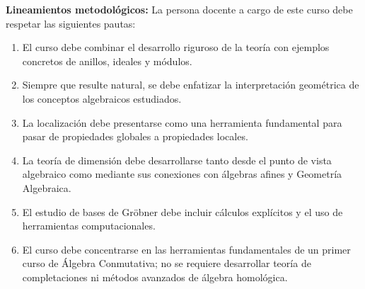 \begin{refsection}
\noindent \textbf{Lineamientos metodológicos:} La persona docente a cargo de este curso debe respetar las siguientes pautas:
\begin{enumerate}
    \item El curso debe combinar el desarrollo riguroso de la teoría con ejemplos concretos de anillos, ideales y módulos.
    \item Siempre que resulte natural, se debe enfatizar la interpretación geométrica de los conceptos algebraicos estudiados.
    \item La localización debe presentarse como una herramienta fundamental para pasar de propiedades globales a propiedades locales.
    \item La teoría de dimensión debe desarrollarse tanto desde el punto de vista algebraico como mediante sus conexiones con álgebras afines y Geometría Algebraica.
    \item El estudio de bases de Gröbner debe incluir cálculos explícitos y el uso de herramientas computacionales.
    \item El curso debe concentrarse en las herramientas fundamentales de un primer curso de Álgebra Conmutativa; no se requiere desarrollar teoría de completaciones ni métodos avanzados de álgebra homológica.
\end{enumerate}


\end{refsection}
